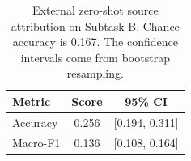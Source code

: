 \begin{table}[t]
    \centering
    \caption{External zero-shot source attribution on \semeval Subtask B. Chance accuracy is 0.167. The confidence intervals come from bootstrap resampling.}
    \label{tab:semeval_results}
    \begin{tabular}{@{}lcc@{}}
        \toprule
        Metric & Score & 95\% CI \\
        \midrule
        Accuracy & 0.256 & [0.194, 0.311] \\
        Macro-F1 & 0.136 & [0.108, 0.164] \\
        \bottomrule
    \end{tabular}
\end{table}
